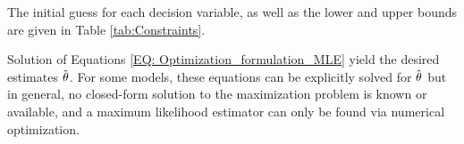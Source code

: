 \documentclass[../Article_Model_Parameters.tex]{subfiles}
\begin{document}
	The initial guess for each decision variable, as well as the lower and upper bounds are given in Table \ref{tab:Constraints}. 
	
	\begin{table}[h]
		\caption{Constraints and initial guess}
		\label{tab:Constraints}
	\end{table}
		
	
	
	Solution of Equations \ref{EQ: Optimization_formulation_MLE} yield the desired estimates $\hat{{\color{black} \theta}}$. For some models, these equations can be explicitly solved for $\hat{{\color{black} \theta}}$ but in general, no closed-form solution to the maximization problem is known or available, and a maximum likelihood estimator can only be found via numerical optimization.
	
	
	
	
	
	
\end{document}
